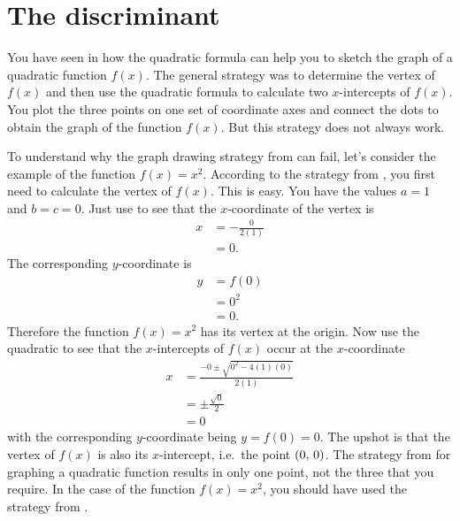 \documentclass[a4paper,oneside,12pt]{article}
\begin{document}

\section{The discriminant}

You have seen in  how the quadratic
formula can help you to sketch the graph of a quadratic function
$f(x)$.  The general strategy was to determine the vertex of $f(x)$
and then use the quadratic formula to calculate two $x$-intercepts of
$f(x)$.  You plot the three points on one set of coordinate axes and
connect the dots to obtain the graph of the function $f(x)$.  But this
strategy does not always work.

To understand why the graph drawing strategy
from  can fail, let's consider the
example of the function $f(x) = x^2$.  According to the strategy
from , you first need to calculate the
vertex of $f(x)$.  This is easy.  You have the values $a = 1$ and
$b = c = 0$.  Just use  to see
that the $x$-coordinate of the vertex is
\begin{align*}
x
&=
-\frac{0}{2(1)} \\[4pt]
&=
0.
\end{align*}
The corresponding $y$-coordinate is
\begin{align*}
y
&=
f(0) \\[4pt]
&=
0^2 \\[4pt]
&=
0.
\end{align*}
Therefore the function $f(x) = x^2$ has its vertex at the origin.  Now
use the quadratic  to see that the
$x$-intercepts of $f(x)$ occur at the $x$-coordinate
\begin{align*}
x
&=
\frac{
  -0 \pm \sqrt{0^2 - 4(1)(0)}
}{
  2(1)
} \\[4pt]
&=
\pm
\frac{
  \sqrt{0}
}{
  2
} \\[4pt]
&=
0
\end{align*}
with the corresponding $y$-coordinate being $y = f(0) = 0$.  The
upshot is that the vertex of $f(x)$ is also its $x$-intercept,
i.e.~the point $\left\lparen{0},\, {0}\right\rparen$.  The strategy
from  for graphing a quadratic function
results in only one point, not the three that you require.  In the
case of the function $f(x) = x^2$, you should have used the strategy
from .
\end{document}
